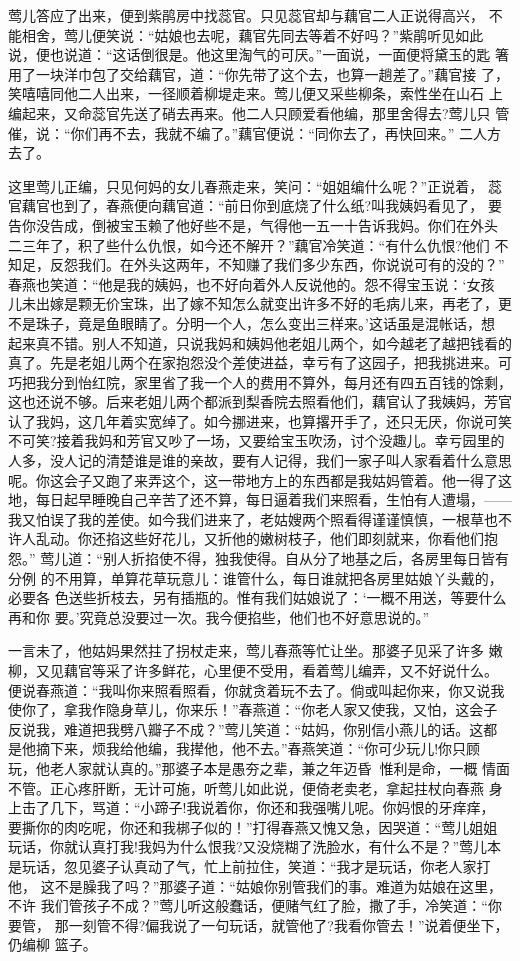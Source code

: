 莺儿答应了出来，便到紫鹃房中找蕊官。只见蕊官却与藕官二人正说得高兴，
不能相舍，莺儿便笑说：“姑娘也去呢，藕官先同去等着不好吗？”紫鹃听见如此
说，便也说道：“这话倒很是。他这里淘气的可厌。”一面说，一面便将黛玉的匙
箸用了一块洋巾包了交给藕官，道：“你先带了这个去，也算一趟差了。”藕官接
了，笑嘻嘻同他二人出来，一径顺着柳堤走来。莺儿便又采些柳条，索性坐在山石
上编起来，又命蕊官先送了硝去再来。他二人只顾爱看他编，那里舍得去?莺儿只
管催，说：“你们再不去，我就不编了。”藕官便说：“同你去了，再快回来。”
二人方去了。

这里莺儿正编，只见何妈的女儿春燕走来，笑问：“姐姐编什么呢？”正说着，
蕊官藕官也到了，春燕便向藕官道：“前日你到底烧了什么纸?叫我姨妈看见了，
要告你没告成，倒被宝玉赖了他好些不是，气得他一五一十告诉我妈。你们在外头
二三年了，积了些什么仇恨，如今还不解开？”藕官冷笑道：“有什么仇恨?他们
不知足，反怨我们。在外头这两年，不知赚了我们多少东西，你说说可有的没的？”
春燕也笑道：“他是我的姨妈，也不好向着外人反说他的。怨不得宝玉说：‘女孩
儿未出嫁是颗无价宝珠，出了嫁不知怎么就变出许多不好的毛病儿来，再老了，更
不是珠子，竟是鱼眼睛了。分明一个人，怎么变出三样来。’这话虽是混帐话，想
起来真不错。别人不知道，只说我妈和姨妈他老姐儿两个，如今越老了越把钱看的
真了。先是老姐儿两个在家抱怨没个差使进益，幸亏有了这园子，把我挑进来。可
巧把我分到怡红院，家里省了我一个人的费用不算外，每月还有四五百钱的馀剩，
这也还说不够。后来老姐儿两个都派到梨香院去照看他们，藕官认了我姨妈，芳官
认了我妈，这几年着实宽绰了。如今挪进来，也算撂开手了，还只无厌，你说可笑
不可笑?接着我妈和芳官又吵了一场，又要给宝玉吹汤，讨个没趣儿。幸亏园里的
人多，没人记的清楚谁是谁的亲故，要有人记得，我们一家子叫人家看着什么意思
呢。你这会子又跑了来弄这个，这一带地方上的东西都是我姑妈管着。他一得了这
地，每日起早睡晚自己辛苦了还不算，每日逼着我们来照看，生怕有人遭塌，——
我又怕误了我的差使。如今我们进来了，老姑嫂两个照看得谨谨慎慎，一根草也不
许人乱动。你还掐这些好花儿，又折他的嫩树枝子，他们即刻就来，你看他们抱怨。”
莺儿道：“别人折掐使不得，独我使得。自从分了地基之后，各房里每日皆有分例
的不用算，单算花草玩意儿：谁管什么，每日谁就把各房里姑娘丫头戴的，必要各
色送些折枝去，另有插瓶的。惟有我们姑娘说了：‘一概不用送，等要什么再和你
要。’究竟总没要过一次。我今便掐些，他们也不好意思说的。”

一言未了，他姑妈果然拄了拐杖走来，莺儿春燕等忙让坐。那婆子见采了许多
嫩柳，又见藕官等采了许多鲜花，心里便不受用，看着莺儿编弄，又不好说什么。
便说春燕道：“我叫你来照看照看，你就贪着玩不去了。倘或叫起你来，你又说我
使你了，拿我作隐身草儿，你来乐！”春燕道：“你老人家又使我，又怕，这会子
反说我，难道把我劈八瓣子不成？”莺儿笑道：“姑妈，你别信小燕儿的话。这都
是他摘下来，烦我给他编，我撵他，他不去。”春燕笑道：“你可少玩儿!你只顾
玩，他老人家就认真的。”那婆子本是愚夯之辈，兼之年迈昏，惟利是命，一概
情面不管。正心疼肝断，无计可施，听莺儿如此说，便倚老卖老，拿起拄杖向春燕
身上击了几下，骂道：“小蹄子!我说着你，你还和我强嘴儿呢。你妈恨的牙痒痒，
要撕你的肉吃呢，你还和我梆子似的！”打得春燕又愧又急，因哭道：“莺儿姐姐
玩话，你就认真打我!我妈为什么恨我?又没烧糊了洗脸水，有什么不是？”莺儿本
是玩话，忽见婆子认真动了气，忙上前拉住，笑道：“我才是玩话，你老人家打他，
这不是臊我了吗？”那婆子道：“姑娘你别管我们的事。难道为姑娘在这里，不许
我们管孩子不成？”莺儿听这般蠢话，便赌气红了脸，撒了手，冷笑道：“你要管，
那一刻管不得?偏我说了一句玩话，就管他了?我看你管去！”说着便坐下，仍编柳
篮子。

